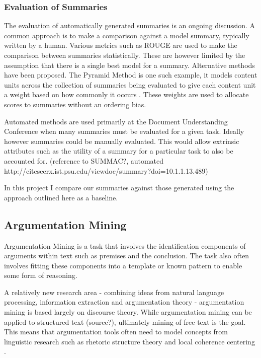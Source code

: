       \subsubsection{Evaluation of Summaries}
        The evaluation of automatically generated summaries is an ongoing discussion. A common approach is to make a comparison against a model summary, typically written by a human. Various metrics such as ROUGE \cite{lin2004rouge} are used to make the comparison between summaries statistically. These are however limited by the assumption that there is a single best model for a summary. Alternative methods have been proposed. The Pyramid Method is one such example, it models content units across the collection of summaries being evaluated to give each content unit a weight based on how commonly it occurs \cite{nenkova2004evaluating}. These weights are used to allocate scores to summaries without an ordering bias.

        Automated methods are used primarily at the Document Understanding Conference when many summaries must be evaluated for a given task. Ideally however summaries could be manually evaluated. This would allow extrinsic attributes such as the utility of a summary for a particular task to also be accounted for. (reference to SUMMAC?, automated http://citeseerx.ist.psu.edu/viewdoc/summary?doi=10.1.1.13.489)

        In this project I compare our summaries against those generated using the approach outlined here \cite{nenkova2006compositional} as a baseline.

    \subsection{Argumentation Mining}
      Argumentation Mining is a task that involves the identification components of arguments within text such as premises and the conclusion. The task also often involves fitting these components into a template or known pattern to enable some form of reasoning. \cite{palau2009argumentation}

      A relatively new research area - combining ideas from natural language processing, information extraction and argumentation theory - argumentation mining is based largely on discourse  theory. While argumentation mining can be applied to structured text (source?), ultimately mining of free text is the goal. This means that argumentation tools often need to model concepts from linguistic research such as rhetoric structure theory \cite{mann1988rhetorical} and local coherence centering \cite{weinstein21centering}.


